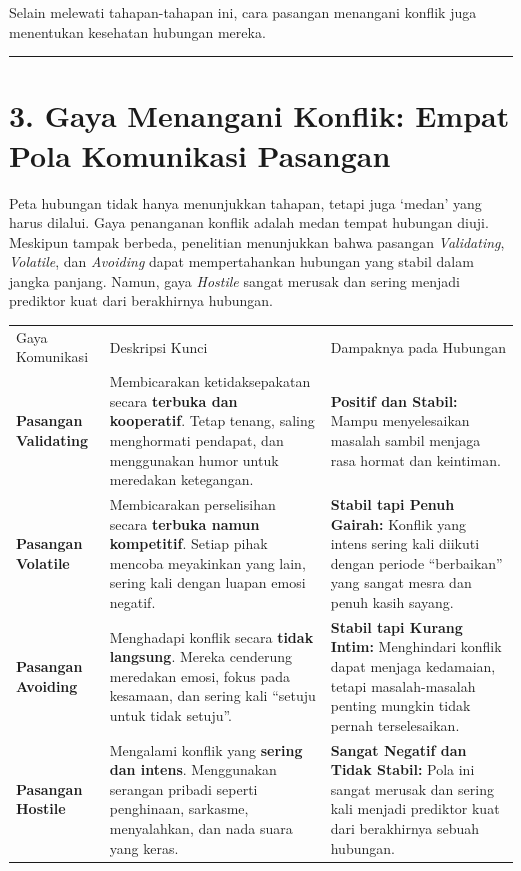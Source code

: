 \documentclass[
  letterpaper,
  DIV=11,
  numbers=noendperiod]{scrreprt}
\begin{document}
Selain melewati tahapan-tahapan ini, cara pasangan menangani konflik
juga menentukan kesehatan hubungan mereka.

\begin{center}\rule{0.5\linewidth}{0.5pt}\end{center}

\section{3. Gaya Menangani Konflik: Empat Pola Komunikasi
Pasangan}\label{gaya-menangani-konflik-empat-pola-komunikasi-pasangan}

Peta hubungan tidak hanya menunjukkan tahapan, tetapi juga `medan' yang
harus dilalui. Gaya penanganan konflik adalah medan tempat hubungan
diuji. Meskipun tampak berbeda, penelitian menunjukkan bahwa pasangan
\emph{Validating}, \emph{Volatile}, dan \emph{Avoiding} dapat
mempertahankan hubungan yang stabil dalam jangka panjang. Namun, gaya
\emph{Hostile} sangat merusak dan sering menjadi prediktor kuat dari
berakhirnya hubungan.

\begin{longtable}[]{@{}
  >{\raggedright\arraybackslash}p{}
  >{\raggedright\arraybackslash}p{}
  >{\raggedright\arraybackslash}p{}@{}}
\toprule\noalign{}
\endhead
\bottomrule\noalign{}
\endlastfoot
Gaya Komunikasi & Deskripsi Kunci & Dampaknya pada Hubungan \\
\textbf{Pasangan Validating} & Membicarakan ketidaksepakatan secara
\textbf{terbuka dan kooperatif}. Tetap tenang, saling menghormati
pendapat, dan menggunakan humor untuk meredakan ketegangan. &
\textbf{Positif dan Stabil:} Mampu menyelesaikan masalah sambil menjaga
rasa hormat dan keintiman. \\
\textbf{Pasangan Volatile} & Membicarakan perselisihan secara
\textbf{terbuka namun kompetitif}. Setiap pihak mencoba meyakinkan yang
lain, sering kali dengan luapan emosi negatif. & \textbf{Stabil tapi
Penuh Gairah:} Konflik yang intens sering kali diikuti dengan periode
``berbaikan'' yang sangat mesra dan penuh kasih sayang. \\
\textbf{Pasangan Avoiding} & Menghadapi konflik secara \textbf{tidak
langsung}. Mereka cenderung meredakan emosi, fokus pada kesamaan, dan
sering kali ``setuju untuk tidak setuju''. & \textbf{Stabil tapi Kurang
Intim:} Menghindari konflik dapat menjaga kedamaian, tetapi
masalah-masalah penting mungkin tidak pernah terselesaikan. \\
\textbf{Pasangan Hostile} & Mengalami konflik yang \textbf{sering dan
intens}. Menggunakan serangan pribadi seperti penghinaan, sarkasme,
menyalahkan, dan nada suara yang keras. & \textbf{Sangat Negatif dan
Tidak Stabil:} Pola ini sangat merusak dan sering kali menjadi prediktor
kuat dari berakhirnya sebuah hubungan. \\
\end{longtable}
\end{document}
